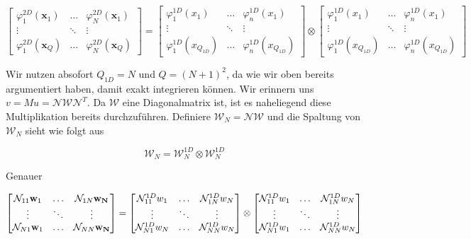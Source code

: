 \begin{equation*}
\begin{bmatrix}
\varphi^{2D}_1(\bm{x}_1) & \hdots & \varphi^{2D}_N(\bm{x}_1) \\
\vdots & \ddots & \vdots \\
\varphi^{2D}_1(\bm{x}_Q) & \hdots & \varphi^{2D}_N(\bm{x}_Q)
\end{bmatrix}
=
\begin{bmatrix}
\varphi^{1D}_1(x_1) & \hdots & \varphi^{1D}_n(x_1) \\
\vdots & \ddots & \vdots \\
\varphi^{1D}_1(x_{Q_{1D}}) & \hdots & \varphi^{1D}_n(x_{Q_{1D}})
\end{bmatrix}
\otimes
\begin{bmatrix}
\varphi^{1D}_1(x_1) & \hdots & \varphi^{1D}_n(x_1) \\
\vdots & \ddots & \vdots \\
\varphi^{1D}_1(x_{Q_{1D}}) & \hdots & \varphi^{1D}_n(x_{Q_{1D}})
\end{bmatrix}
\end{equation*}

Wir nutzen absofort $Q_{1D}=N$ und $Q=(N+1)^2$, da wie wir oben bereits argumentiert haben, damit exakt integrieren können.
Wir erinnern uns $v=Mu=\mathcal{N} \mathcal{W} \mathcal{N}^T$. Da $\mathcal{W}$ eine Diagonalmatrix ist, ist es naheliegend diese Multiplikation bereits durchzuführen. Definiere $\mathcal{W}_{N}=\mathcal{N} \mathcal{W}$ und die Spaltung von $\mathcal{W}_N$ sieht wie folgt aus

\begin{equation}
\mathcal{W}_N = \mathcal{W}_N^{1D} \otimes \mathcal{W}_N^{1D}
\end{equation}

Genauer

\begin{equation*}
\begin{bmatrix}
\mathcal{N}_{11} \bold{w}_1 & \hdots & \mathcal{N}_{1N} \bold{w_N} \\
\vdots & \ddots & \vdots \\
\mathcal{N}_{N1} \bold{w}_1 & \hdots & \mathcal{N}_{NN} \bold{w_N}
\end{bmatrix}
= 
\begin{bmatrix}
\mathcal{N}_{11}^{1D} w_1 & \hdots & \mathcal{N}_{1N}^{1D} w_N \\
\vdots & \ddots & \vdots \\
\mathcal{N}_{N1}^{1D} w_N & \hdots & \mathcal{N}_{NN}^{1D} w_N
\end{bmatrix}
\otimes
\begin{bmatrix}
\mathcal{N}_{11}^{1D} w_1 & \hdots & \mathcal{N}_{1N}^{1D} w_N \\
\vdots & \ddots & \vdots \\
\mathcal{N}_{N1}^{1D} w_1 & \hdots & \mathcal{N}_{NN}^{1D}w_N
\end{bmatrix}
\end{equation*}

